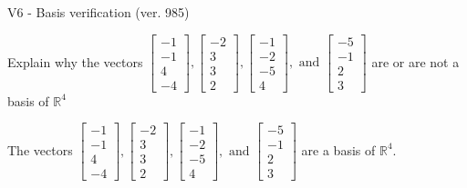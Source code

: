\begin{exercise}
  \begin{exerciseTitle}V6 - Basis verification (ver. 985)\end{exerciseTitle}
  \begin{exerciseStatement}
    Explain why the vectors \(\left[\begin{array}{r}
-1 \\
-1 \\
4 \\
-4
\end{array}\right] , \left[\begin{array}{r}
-2 \\
3 \\
3 \\
2
\end{array}\right] , \left[\begin{array}{r}
-1 \\
-2 \\
-5 \\
4
\end{array}\right] , \text{ and } \left[\begin{array}{r}
-5 \\
-1 \\
2 \\
3
\end{array}\right]\) are or are not a basis of \(\mathbb{R}^4\)	


  \end{exerciseStatement}
  \begin{exerciseAnswer}
   The vectors \(\left[\begin{array}{r}
-1 \\
-1 \\
4 \\
-4
\end{array}\right] , \left[\begin{array}{r}
-2 \\
3 \\
3 \\
2
\end{array}\right] , \left[\begin{array}{r}
-1 \\
-2 \\
-5 \\
4
\end{array}\right] , \text{ and } \left[\begin{array}{r}
-5 \\
-1 \\
2 \\
3
\end{array}\right]\) 
  	 are  a basis of \(\mathbb{R}^4\).
  


  \end{exerciseAnswer}
\end{exercise}